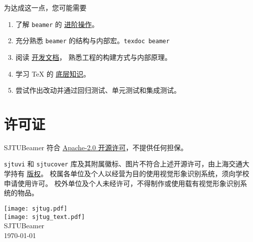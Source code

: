 \documentclass[
    UTF8,
    heading=true,
    12pt,
    a4paper
]{ctexrep}
\def\themename{\textsf{SJTUBeamer}}
\begin{document}
为达成这一点，您可能需要
\begin{enumerate}
  \item 了解 \texttt{beamer}
        的 \href{https://latex-beamer.com/}{进阶操作}。
  \item 充分熟悉 \texttt{beamer}
        的结构与内部宏。\texttt{texdoc beamer}
  \item 阅读
        \href{run:sjtubeamerdevguide.pdf}{开发文档}，
        熟悉工程的构建方式与内部原理。
  \item 学习 \TeX{} 的
        \href{https://mirrors.sjtug.sjtu.edu.cn/CTAN/graphics/pgf/contrib/pgfplots/doc/TeX-programming-notes.pdf}{底层知识}。
  \item 尝试作出改动并通过回归测试、单元测试和集成测试。
\end{enumerate}

\chapter*{许可证}

\themename{} 符合
\href{https://github.com/sjtug/SJTUBeamer/blob/main/LICENSE}{Apache-2.0 开源许可}，不提供任何担保。

\texttt{sjtuvi} 和 \texttt{sjtucover}
库及其附属徽标、图片不符合上述开源许可，由上海交通大学持有
\href{https://vi.sjtu.edu.cn/index.php/articles/bulletin/16}{版权}。
校属各单位及个人以经营为目的使用视觉形象识别系统，须向学校申请使用许可。
校外单位及个人未经许可，不得制作或使用载有视觉形象识别系统的物品。

\def\sjtuglogo{
  \texttt{[image: sjtug.pdf]}\\
  \vspace*{5pt}
  \texttt{[image: sjtug\_text.pdf]}
}

\vfill
{
\centering
\sjtuglogo\\
{\large \themename{}\\}
\today\\
}
\vfill
\end{document}

